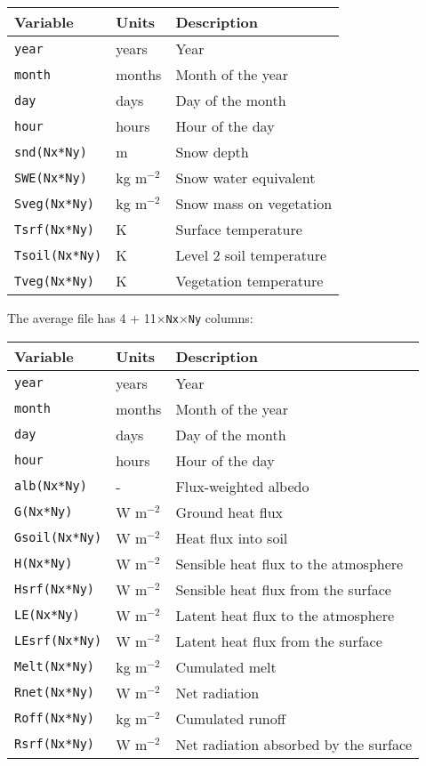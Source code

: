 \documentclass{article}
\begin{document}
\begin{longtable}{|l|l|l|}
\hline
Variable & Units & Description \\
\hline
{\tt year}        & years       & Year                     \\
{\tt month}       & months      & Month of the year        \\
{\tt day}         & days        & Day of the month         \\
{\tt hour}        & hours       & Hour of the day          \\
{\tt snd(Nx*Ny)}  & m           & Snow depth               \\
{\tt SWE(Nx*Ny)}  & kg m$^{-2}$ & Snow water equivalent    \\
{\tt Sveg(Nx*Ny)} & kg m$^{-2}$ & Snow mass on vegetation  \\
{\tt Tsrf(Nx*Ny)} & K           & Surface temperature      \\
{\tt Tsoil(Nx*Ny)}& K           & Level 2 soil temperature \\
{\tt Tveg(Nx*Ny)} & K           & Vegetation temperature   \\
\hline 
\end{longtable}

The average file has 4 + 11$\times${\tt Nx$\times$Ny} columns:

\begin{longtable}{|l|l|l|}
\hline
Variable & Units & Description \\
\hline
{\tt year}        & years       & Year                                 \\
{\tt month}       & months      & Month of the year                    \\
{\tt day}         & days        & Day of the month                     \\
{\tt hour}        & hours       & Hour of the day                      \\
{\tt alb(Nx*Ny)}  & -           & Flux-weighted albedo                 \\
{\tt G(Nx*Ny)}    & W m$^{-2}$  & Ground heat flux                     \\
{\tt Gsoil(Nx*Ny)}& W m$^{-2}$  & Heat flux into soil                  \\
{\tt H(Nx*Ny)}    & W m$^{-2}$  & Sensible heat flux to the atmosphere \\
{\tt Hsrf(Nx*Ny)} & W m$^{-2}$  & Sensible heat flux from the surface  \\
{\tt LE(Nx*Ny)}   & W m$^{-2}$  & Latent heat flux to the atmosphere   \\
{\tt LEsrf(Nx*Ny)}& W m$^{-2}$  & Latent heat flux from the surface    \\
{\tt Melt(Nx*Ny)} & kg m$^{-2}$ & Cumulated melt                       \\
{\tt Rnet(Nx*Ny)} & W m$^{-2}$  & Net radiation                        \\
{\tt Roff(Nx*Ny)} & kg m$^{-2}$ & Cumulated runoff                     \\
{\tt Rsrf(Nx*Ny)} & W m$^{-2}$  & Net radiation absorbed by the surface\\
\hline 
\end{longtable}
\end{document}
